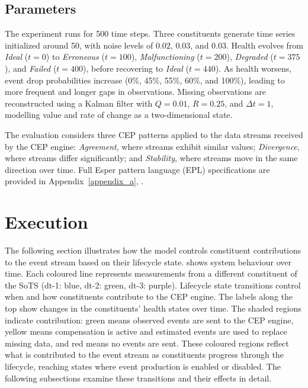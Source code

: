 \subsection{Parameters}
The experiment runs for 500 time steps. Three constituents generate time series initialized around 50, with noise levels of $0.02$, $0.03$, and $0.03$. Health evolves from \textit{Ideal} ($t=0$) to \textit{Erroneous} ($t=100$), \textit{Malfunctioning} ($t=200$), \textit{Degraded} ($t=375$), and \textit{Failed} ($t=400$), before recovering to \textit{Ideal} ($t=440$). As health worsens, event drop probabilities increase (0\%, 45\%, 55\%, 60\%, and 100\%), leading to more frequent and longer gaps in observations. Missing observations are reconstructed using a Kalman filter with $Q = 0.01$, $R = 0.25$, and $\Delta t = 1$, modelling value and rate of change as a two-dimensional state.

The evaluation considers three CEP patterns applied to the data streams received by the CEP engine: \textit{Agreement}, where streams exhibit similar values; \textit{Divergence}, where streams differ significantly; and \textit{Stability}, where streams move in the same direction over time. Full Esper pattern language (EPL) specifications are provided in Appendix~\ref{appendix_a}, .

\section{Execution}\label{sec:execution}
The following section illustrates how the model controls constituent contributions to the event stream based on their lifecycle state.  shows system behaviour over time. Each coloured line represents measurements from a different constituent of the SoTS (dt-1: blue, dt-2: green, dt-3: purple). Lifecycle state transitions control when and how constituents contribute to the CEP engine. The labels along the top show changes in the constituents’ health states over time. The shaded regions indicate contribution: green means observed events are sent to the CEP engine, yellow means compensation is active and estimated events are used to replace missing data, and red means no events are sent. These coloured regions reflect what is contributed to the event stream as constituents progress through the lifecycle, reaching states where event production is enabled or disabled. The following subsections examine these transitions and their effects in detail.



